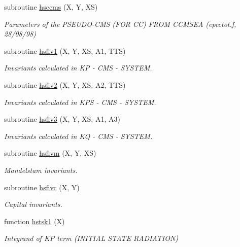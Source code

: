 \begin{DoxyCompactItemize}
subroutine \hyperlink{djangoh__h_8f_a2766b8193d774f9b208a7c39e48e2953}{hsccms} (X, Y, XS)
\begin{DoxyCompactList}\small\item\em Parameters of the P\+S\+E\+U\+D\+O-\/\+C\+MS (F\+OR CC) F\+R\+OM C\+C\+M\+S\+EA (epcctot.\+f, 28/08/98) \end{DoxyCompactList}\item 
subroutine \hyperlink{djangoh__h_8f_aff94430da824540e2ef916d64fbabe04}{hsfiv1} (X, Y, XS, A1, T\+TS)
\begin{DoxyCompactList}\small\item\em Invariants calculated in KP -\/ C\+MS -\/ S\+Y\+S\+T\+EM. \end{DoxyCompactList}\item 
subroutine \hyperlink{djangoh__h_8f_ab9ff484ceb4fac27e8d018d8c9e1e948}{hsfiv2} (X, Y, XS, A2, T\+TS)
\begin{DoxyCompactList}\small\item\em Invariants calculated in K\+PS -\/ C\+MS -\/ S\+Y\+S\+T\+EM. \end{DoxyCompactList}\item 
subroutine \hyperlink{djangoh__h_8f_ab499d5121f5e51b92ea25dc130ecc954}{hsfiv3} (X, Y, XS, A1, A3)
\begin{DoxyCompactList}\small\item\em Invariants calculated in KQ -\/ C\+MS -\/ S\+Y\+S\+T\+EM. \end{DoxyCompactList}\item 
subroutine \hyperlink{djangoh__h_8f_ac2ab613f5f604e067429f62b9fcd2e1f}{hsfivm} (X, Y, XS)
\begin{DoxyCompactList}\small\item\em Mandelstam invariants. \end{DoxyCompactList}\item 
subroutine \hyperlink{djangoh__h_8f_a23b8c9868ae8791b60c787b7c9d8f6c2}{hsfivc} (X, Y)
\begin{DoxyCompactList}\small\item\em Capital invariants. \end{DoxyCompactList}\item 
function \hyperlink{djangoh__h_8f_ad0b2c59952700c259f58d2541555ac65}{hstsk1} (X)
\begin{DoxyCompactList}\small\item\em Integrand of KP term (I\+N\+I\+T\+I\+AL S\+T\+A\+TE R\+A\+D\+I\+A\+T\+I\+ON) \end{DoxyCompactList}\item 

\end{DoxyCompactItemize}
